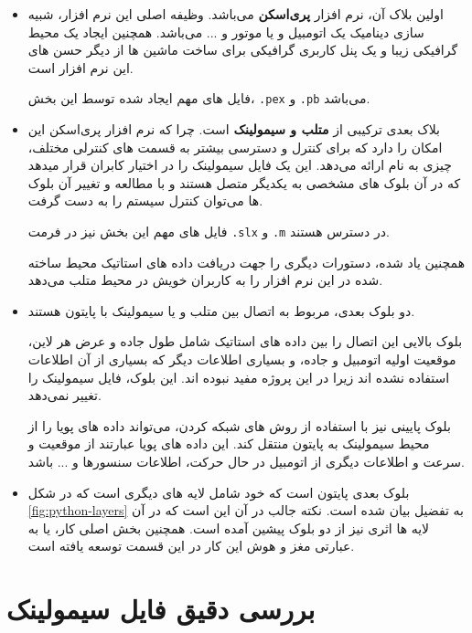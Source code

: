 \begin{itemize}
	\item 
	اولین بلاک آن، نرم افزار \textbf{پری‌اسکن }می‌باشد. وظیفه اصلی این نرم افزار، شبیه سازی دینامیک یک اتومبیل و یا موتور و ... می‌باشد. همچنین ایجاد یک محیط گرافیکی زیبا و یک پنل کاربری گرافیکی برای ساخت ماشین ها از دیگر حسن های این نرم افزار است.
	
	فایل های مهم ایجاد شده توسط این بخش، \texttt{.pex} و \texttt{.pb} می‌باشد.
	
	\item
	بلاک بعدی ترکیبی از \textbf{متلب و سیمولینک }است. چرا که نرم افزار پری‌اسکن این امکان را دارد که برای کنترل و دسترسی بیشتر به قسمت های کنترلی مختلف، چیزی به نام  ارائه می‌دهد. این  یک فایل سیمولینک را در اختیار کابران قرار میدهد که در آن بلوک های مشخصی به یکدیگر متصل هستند و با مطالعه و تغییر آن بلوک ها می‌توان کنترل سیستم را به دست گرفت.
	
	فایل های مهم این بخش نیز در فرمت \texttt{.slx} و \texttt{.m} در دسترس هستند.
	
	همچنین \api یاد شده، دستورات دیگری را جهت دریافت داده های استاتیک محیط ساخته شده در این نرم افزار را به کاربران خویش در محیط متلب می‌دهد.
	
	\item
	دو بلوک بعدی، مربوط به اتصال بین متلب و یا سیمولینک با پایتون هستند. 
	
	بلوک بالایی این اتصال را بین داده های استاتیک شامل طول جاده و عرض هر لاین، موقعیت اولیه اتومبیل و جاده، و بسیاری اطلاعات دیگر که بسیاری از آن اطلاعات استفاده نشده اند زیرا در این پروژه مفید نبوده اند. این بلوک، فایل سیمولینک را تغییر نمی‌دهد.
	
	بلوک پایینی نیز با استفاده از روش های شبکه کردن، می‌تواند داده های پویا را از محیط سیمولینک به پایتون منتقل کند. این داده های پویا عبارتند از موقعیت و سرعت و اطلاعات دیگری از اتومبیل در حال حرکت، اطلاعات سنسورها و ... باشد.
	
	\item 
	بلوک بعدی پایتون است که خود شامل لایه های دیگری است که در شکل 
	\ref{fig:python-layers}
	به تفضیل بیان شده است. نکته جالب در آن این است که در آن لایه ها اثری نیز از دو بلوک پیشین آمده است. همچنین بخش اصلی کار، یا به عبارتی مغز و هوش این کار در این قسمت توسعه یافته است.
\end{itemize}

\section{بررسی دقیق فایل سیمولینک}\label{ch:fani|sec:simulink}

